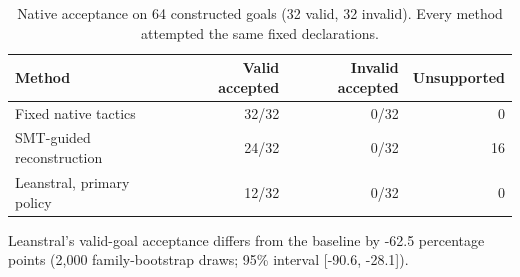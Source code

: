 \begin{table}[t]
\centering\small
\caption{Native acceptance on 64 constructed goals (32 valid, 32 invalid). Every method attempted the same fixed declarations.}
\label{tab:assistance-results}
\begin{tabular}{lrrr}\toprule
Method & Valid accepted & Invalid accepted & Unsupported\\\midrule
Fixed native tactics & 32/32 & 0/32 & 0\\
SMT-guided reconstruction & 24/32 & 0/32 & 16\\
Leanstral, primary policy & 12/32 & 0/32 & 0\\
\bottomrule
\end{tabular}
\end{table}
Leanstral's valid-goal acceptance differs from the baseline by -62.5 percentage points (2,000 family-bootstrap draws; 95\% interval [-90.6, -28.1]).
